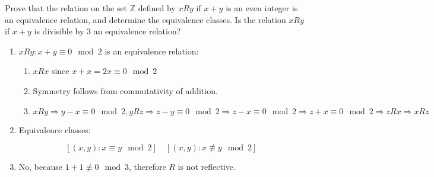 \begin{exercise}
    Prove that the relation on the set \(\mathbb{Z}\) defined by \(xRy\) if \(x + y\) is an even integer is an equivalence relation, and determine the equivalence classes. Is the relation \(xRy\) if \(x + y\) is divisible by \(3\) an equivalence relation?
\end{exercise}
\begin{solution}\itemfix
    \begin{enumerate}
        \item \(xRy : x + y \equiv 0 \mod 2\) is an equivalence relation:

              \begin{enumerate}
                  \item \(xRx\) since \(x + x = 2x \equiv 0 \mod 2\)
                  \item Symmetry follows from commutativity of addition.
                  \item \(xRy \Rightarrow y - x \equiv 0 \mod 2, yRz \Rightarrow z - y \equiv 0 \mod 2 \Rightarrow z - x \equiv 0 \mod 2 \Rightarrow z + x \equiv 0 \mod 2 \Rightarrow zRx \Rightarrow xRz\)
              \end{enumerate}

        \item Equivalence classes:

              \[[(x, y) : x \equiv y \mod 2] \quad [(x, y) : x \not\equiv y \mod 2]\]

        \item No, because \(1 + 1 \not\equiv 0 \mod 3\), therefore \(R\) is not reflective.
    \end{enumerate}
\end{solution}

